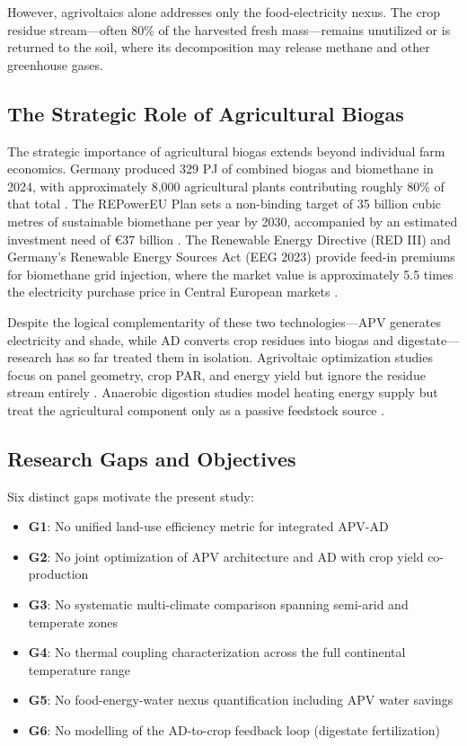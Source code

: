 \documentclass[12pt, a4paper]{article}
\begin{document}
However, agrivoltaics alone addresses only the food-electricity nexus. The crop residue stream—often 80\% of the harvested fresh mass—remains unutilized or is returned to the soil, where its decomposition may release methane and other greenhouse gases.

\subsection{The Strategic Role of Agricultural Biogas}

\hspace{1cm}The strategic importance of agricultural biogas extends beyond individual farm economics. Germany produced 329 PJ of combined biogas and biomethane in 2024, with approximately 8,000 agricultural plants contributing roughly 80\% of that total \cite{iea2025, eba2025}. The REPowerEU Plan sets a non-binding target of 35 billion cubic metres of sustainable biomethane per year by 2030, accompanied by an estimated investment need of €37 billion \cite{ec2022}. The Renewable Energy Directive (RED III) and Germany's Renewable Energy Sources Act (EEG 2023) provide feed-in premiums for biomethane grid injection, where the market value is approximately 5.5 times the electricity purchase price in Central European markets \cite{nikzad2026, rabobank2025}.

Despite the logical complementarity of these two technologies—APV generates electricity and shade, while AD converts crop residues into biogas and digestate—research has so far treated them in isolation. Agrivoltaic optimization studies focus on panel geometry, crop PAR, and energy yield but ignore the residue stream entirely \cite{riaz2022, zainali2023}. Anaerobic digestion studies model heating energy supply but treat the agricultural component only as a passive feedstock source \cite{pal2024, temiz2024}.

\subsection{Research Gaps and Objectives}

\hspace{1cm}Six distinct gaps motivate the present study:

\begin{itemize}[leftmargin=*]
    \item \textbf{G1}: No unified land-use efficiency metric for integrated APV-AD
    \item \textbf{G2}: No joint optimization of APV architecture and AD with crop yield co-production
    \item \textbf{G3}: No systematic multi-climate comparison spanning semi-arid and temperate zones
    \item \textbf{G4}: No thermal coupling characterization across the full continental temperature range
    \item \textbf{G5}: No food-energy-water nexus quantification including APV water savings
    \item \textbf{G6}: No modelling of the AD-to-crop feedback loop (digestate fertilization)
\end{itemize}
\end{document}
